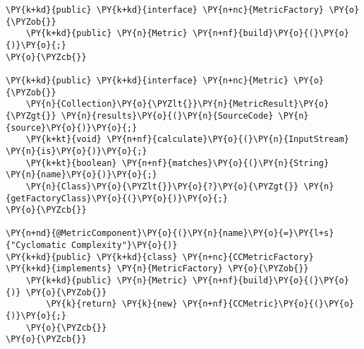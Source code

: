 \begin{Verbatim}[commandchars=\\\{\}]
\PY{k+kd}{public} \PY{k+kd}{interface} \PY{n+nc}{MetricFactory} \PY{o}{\PYZob{}}
    \PY{k+kd}{public} \PY{n}{Metric} \PY{n+nf}{build}\PY{o}{(}\PY{o}{)}\PY{o}{;}
\PY{o}{\PYZcb{}}

\PY{k+kd}{public} \PY{k+kd}{interface} \PY{n+nc}{Metric} \PY{o}{\PYZob{}}
    \PY{n}{Collection}\PY{o}{\PYZlt{}}\PY{n}{MetricResult}\PY{o}{\PYZgt{}} \PY{n}{results}\PY{o}{(}\PY{n}{SourceCode} \PY{n}{source}\PY{o}{)}\PY{o}{;}
    \PY{k+kt}{void} \PY{n+nf}{calculate}\PY{o}{(}\PY{n}{InputStream} \PY{n}{is}\PY{o}{)}\PY{o}{;}
    \PY{k+kt}{boolean} \PY{n+nf}{matches}\PY{o}{(}\PY{n}{String} \PY{n}{name}\PY{o}{)}\PY{o}{;}
    \PY{n}{Class}\PY{o}{\PYZlt{}}\PY{o}{?}\PY{o}{\PYZgt{}} \PY{n}{getFactoryClass}\PY{o}{(}\PY{o}{)}\PY{o}{;}
\PY{o}{\PYZcb{}}

\PY{n+nd}{@MetricComponent}\PY{o}{(}\PY{n}{name}\PY{o}{=}\PY{l+s}{"Cyclomatic Complexity"}\PY{o}{)}
\PY{k+kd}{public} \PY{k+kd}{class} \PY{n+nc}{CCMetricFactory} \PY{k+kd}{implements} \PY{n}{MetricFactory} \PY{o}{\PYZob{}}
    \PY{k+kd}{public} \PY{n}{Metric} \PY{n+nf}{build}\PY{o}{(}\PY{o}{)} \PY{o}{\PYZob{}}
        \PY{k}{return} \PY{k}{new} \PY{n+nf}{CCMetric}\PY{o}{(}\PY{o}{)}\PY{o}{;}
    \PY{o}{\PYZcb{}}
\PY{o}{\PYZcb{}}
\end{Verbatim}
